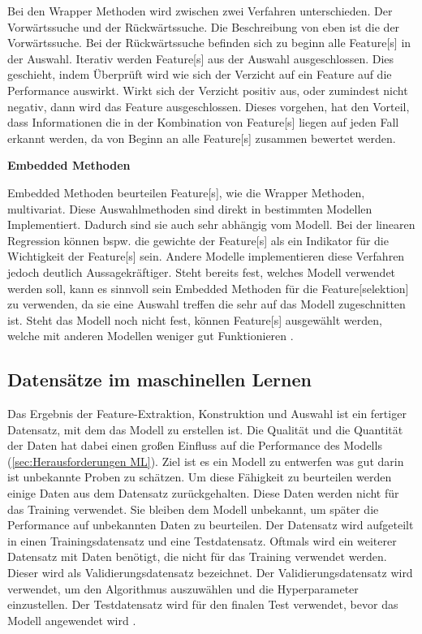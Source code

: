 Bei den \gls{Wrapper Methoden} wird zwischen zwei Verfahren unterschieden. Der Vorwärtssuche und der Rückwärtssuche. Die Beschreibung von eben ist die der Vorwärtssuche. Bei der Rückwärtssuche befinden sich zu beginn alle \gls{Feature}[s] in der Auswahl. Iterativ werden \gls{Feature}[s] aus der Auswahl ausgeschlossen. Dies geschieht, indem Überprüft wird wie sich der Verzicht auf ein \gls{Feature} auf die Performance auswirkt. Wirkt sich der Verzicht positiv aus, oder zumindest nicht negativ, dann wird das \gls{Feature} ausgeschlossen. Dieses vorgehen, hat den Vorteil, dass Informationen die in der Kombination von \gls{Feature}[s] liegen auf jeden Fall erkannt werden, da von Beginn an alle \gls{Feature}[s] zusammen bewertet werden. \dubpar

\textbf{\gls{Embedded Methoden}}\par

 \gls{Embedded Methoden} beurteilen \gls{Feature}[s], wie die \gls{Wrapper Methoden}, multivariat. Diese Auswahlmethoden sind direkt in bestimmten Modellen Implementiert. Dadurch sind sie auch sehr abhängig vom Modell. Bei der linearen Regression können bspw. die gewichte der \gls{Feature}[s] als ein Indikator für die Wichtigkeit der \gls{Feature}[s] sein. Andere Modelle implementieren diese Verfahren jedoch deutlich Aussagekräftiger. Steht bereits fest, welches Modell verwendet werden soll, kann es sinnvoll sein \gls{Embedded Methoden} für die \gls{Feature}[selektion] zu verwenden, da sie eine Auswahl treffen die sehr auf das Modell zugeschnitten ist. Steht das Modell noch nicht fest, können \gls{Feature}[s] ausgewählt werden, welche mit anderen Modellen weniger gut Funktionieren \cite{Guyon.2003, Zheng.2018}.

 \subsection{Datensätze im maschinellen Lernen} \label{sec:Datensätze ML}
 Das Ergebnis der Feature-Extraktion, Konstruktion und Auswahl ist ein fertiger Datensatz, mit dem das Modell zu erstellen ist. Die Qualität und die Quantität der Daten hat dabei einen großen Einfluss auf die Performance des Modells (\ref{sec:Herausforderungen ML}). Ziel ist es ein Modell zu entwerfen was gut darin ist unbekannte Proben zu schätzen. Um diese Fähigkeit zu beurteilen werden einige Daten aus dem Datensatz zurückgehalten. Diese Daten werden nicht für das Training verwendet. Sie bleiben dem Modell unbekannt, um später die Performance auf unbekannten Daten zu beurteilen. Der Datensatz wird aufgeteilt in einen \gls{Trainingsdatensatz} und eine \gls{Testdatensatz}. Oftmals wird ein weiterer Datensatz mit Daten benötigt, die nicht für das Training verwendet werden. Dieser wird als Validierungsdatensatz bezeichnet. Der Validierungsdatensatz wird verwendet, um den Algorithmus auszuwählen und die \gls{Hyperparameter} einzustellen. Der Testdatensatz wird für den finalen Test verwendet, bevor das Modell angewendet wird \cite{Burkov.2019}. \par

